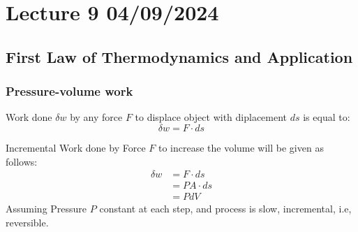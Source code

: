 \documentclass[fleqn,10pt]{SelfArx} %
\begin{document}
\clearpage

\section{Lecture 9 04/09/2024}
\subsection{First Law of Thermodynamics and Application}
\subsubsection*{Pressure-volume work}
Work done $\delta w$ by any force $F$ to displace object with diplacement $ds$ is equal to:
\begin{equation}
    \delta w = F \cdot ds
    \label{eq:work-done}
\end{equation}

Incremental Work done by Force $F$ to increase the volume will be given as follows:
\begin{align}
    \delta w &= F \cdot ds \\
    &= PA\cdot ds \\
    &= PdV
    \label{eq:Pressure-volume-work}
\end{align}
Assuming Pressure $P$ constant at each step, and process is slow, incremental, i.e, reversible.
\end{document}
